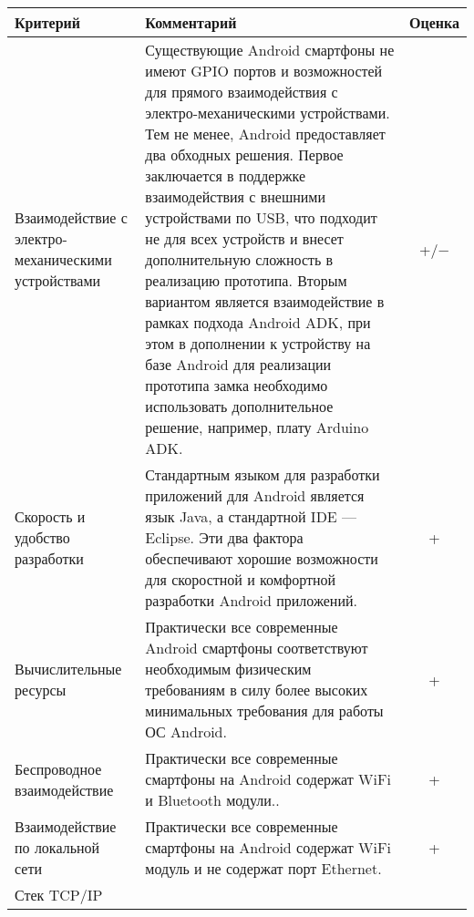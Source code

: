 \begin{longtable}{| p{} | p{} | c |} 

\hline
Критерий & Комментарий & Оценка \\
\hline
Взаимодействие с электро-механическими  устройствами &

Существующие Android смартфоны не имеют GPIO портов и возможностей для прямого взаимодействия с электро-механическими устройствами\cite{AndroidSmarts}. Тем не менее, Android предоставляет два обходных решения. Первое заключается в поддержке взаимодействия с внешними устройствами по USB\cite{AndroidUSB}, что подходит не для всех устройств и внесет дополнительную сложность в реализацию прототипа. Вторым вариантом является взаимодействие в рамках подхода Android ADK\cite{AndroidUSB}, при этом в дополнении к устройству на базе Android для реализации прототипа замка необходимо использовать дополнительное решение, например, плату Arduino ADK. &

+/$-$\\

\hline
Скорость и удобство разработки &

Стандартным языком для разработки приложений для Android является язык Java, а стандартной IDE --- Eclipse\cite{Android}. Эти два фактора обеспечивают хорошие возможности для скоростной и комфортной разработки Android приложений. &

+\\

\hline
Вычислительные ресурсы &

Практически все современные Android смартфоны соответствуют необходимым физическим требованиям\cite{AndroidSmarts} в силу более высоких минимальных требования для работы ОС Android\cite{AndroidHR}. &

+\\

\hline
Беспроводное взаимодействие &

Практически все современные смартфоны на Android содержат WiFi и Bluetooth модули.\cite{AndroidSmarts}. &

+\\

\hline
Взаимодействие по локальной сети &

Практически все современные смартфоны на Android содержат WiFi модуль и не содержат порт Ethernet\cite{AndroidSmarts}.&

+\\

\hline
Стек TCP/IP &


\end{longtable}

